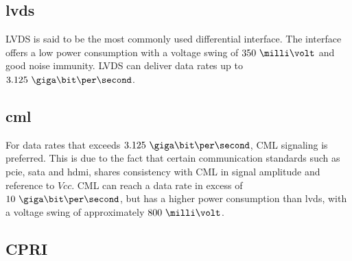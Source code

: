\documentclass[main.tex]{subfiles}
\begin{document}
\subsection{\gls{lvds}}

LVDS is said to be the most commonly used differential interface. The interface offers a low power consumption with a voltage swing of $350\ \milli\volt$ and good noise immunity. LVDS can deliver data rates up to $3.125\ \giga\bit\per\second$. \cite{ti08lvds}

\subsection{\gls{cml}}

For data rates that exceeds $3.125\ \giga\bit\per\second$, CML signaling is preferred. This is due to the fact that certain communication standards such as \acrshort{pcie}, \acrshort{sata} and \acrshort{hdmi}, shares consistency with CML in signal amplitude and reference to $Vcc$. CML can reach a data rate in excess of $10\ \giga\bit\per\second$, but has a higher power consumption than \gls{lvds}, with a voltage swing of approximately $800\ \milli\volt$. \cite{ti08lvds}

\subsection{CPRI}

\end{document}
